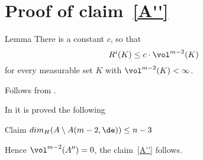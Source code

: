 \section{Proof of claim~\ref{A''}}\label{sec:codim3}

\begin{thm} {Lemma}
There is a constant $c$, so that
$$R^i(K)\le c\cdot \vol^{m-2}(K)$$ for every
measurable set $K$ with $\vol^{m-2}(K)<\infty$.
\end{thm}

Follows from \cite[???]{petrunin-SC}.
\qeds

In \cite{BGP} it is proved the following
\begin{thm}{Claim}
$dim_H(A\setminus A(m-2,\de) )\le n-3$
\end{thm}
Hence $\vol^{m-2}(A'')=0$, the claim~\ref{A''} follows.
